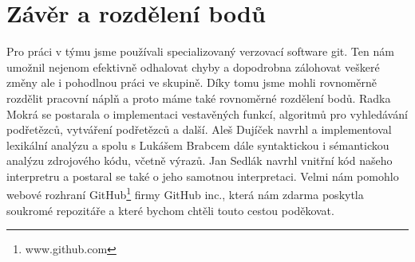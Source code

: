 \documentclass[a4paper,11pt,titlepage]{article}
\begin{document}
\section{Závěr a rozdělení bodů}

Pro práci v týmu jsme používali specializovaný verzovací software git. Ten nám umožnil nejenom efektivně odhalovat chyby a dopodrobna zálohovat veškeré změny ale i pohodlnou práci ve skupině. Díky tomu jsme mohli rovnoměrně rozdělit pracovní náplň a proto máme také rovnoměrné rozdělení bodů. Radka Mokrá se postarala o implementaci vestavěných funkcí, algoritmů pro vyhledávání podřetězců, vytváření podřetězců a další. Aleš Dujíček navrhl a implementoval lexikální analýzu a spolu s Lukášem Brab\-cem dále syntaktickou i sémantickou analýzu zdrojového kódu, včetně vý\-ra\-zů. Jan Sedlák navrhl vnitřní kód našeho interpretru a postaral se také o jeho samotnou interpretaci. Velmi nám pomohlo webové rozhraní GitHub\footnote{www.github.com} firmy GitHub inc., která nám zdarma poskytla soukromé repozitáře a které bychom chtěli touto cestou poděkovat.
\end{document}
